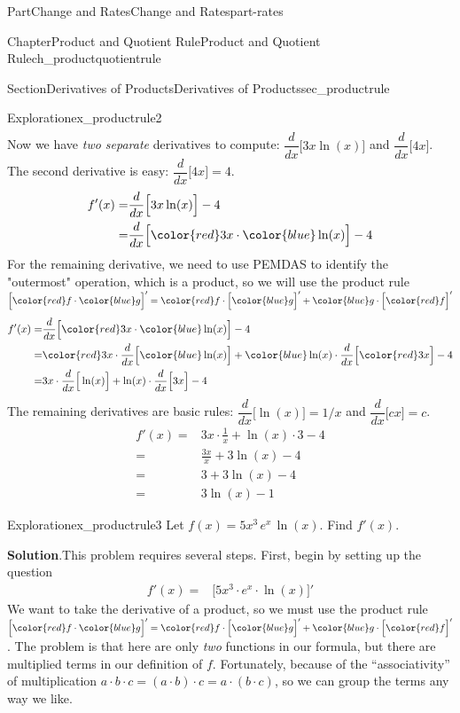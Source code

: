 \documentclass[oneside,10pt,]{tufte-book}
\newcommand{\blocktitlefont}{\relax}
\numberwithin{equation}{chapter}
\newcommand{\red}[1]{   {\color{red}   #1}   }
\newcommand{\blue}[1]{  {\color{blue}  #1}  }
\newcommand{\ddx}[1]{ \dfrac{d}{dx} \Big[ #1 \Big]  }
\newcommand{\D}[1]{ \Big[ #1 \Big]'  }
\newcommand{\amp}{&}
\begin{document}
\begin{partptx}{Part}{Change and Rates}{}{Change and Rates}{}{}{part-rates}
\begin{chapterptx}{Chapter}{Product and Quotient Rule}{}{Product and Quotient Rule}{}{}{ch_productquotientrule}
\begin{sectionptx}{Section}{Derivatives of Products}{}{Derivatives of Products}{}{}{sec_productrule}
\begin{exploration}{Exploration}{}{ex_productrule2}
\begin{align*}
\end{align*}
Now we have \emph{two separate} derivatives to compute: \(\ddx{ 3x\ln(x) } \) and \(\ddx{4x}\). The second derivative is easy: \(\ddx{4x}=4\).%
\begin{align*}
f'(x) = \amp \ddx{ 3x\ln(x) } - 4 \\
= \amp \ddx{ \red{3x}\cdot \blue{\ln(x)} } - 4 
\end{align*}
For the remaining derivative, we need to use PEMDAS to identify the "outermost" operation, which is a product, so we will use the product rule \(\D{\red{f}\cdot \blue{g}} = \red{f}\cdot \D{\blue{g}} + \blue{g}\cdot \D{\red{f}}\)%
\begin{align*}
f'(x) = \amp \ddx{ \red{3x}\cdot \blue{\ln(x)} } - 4 \\
= \amp \red{3x}\cdot \ddx{\blue{\ln(x)} } + \blue{\ln(x)}\cdot \ddx{\red{3x}} - 4 \\
= \amp 3x\cdot \ddx{ \ln(x) } + \ln(x) \cdot \ddx{ 3x } - 4 
\end{align*}
The remaining derivatives are basic rules: \(\ddx{\ln(x)} = 1/x\) and \(\ddx{cx} = c\).%
\begin{align*}
f'(x) = \amp 3x\cdot \frac{1}{x} + \ln(x) \cdot 3 - 4 \\
= \amp \frac{3x}{x} + 3\ln(x) - 4 \\
= \amp 3 + 3\ln(x) - 4 \\
= \amp 3\ln(x) - 1 
\end{align*}
%
\end{exploration}%
\begin{exploration}{Exploration}{}{ex_productrule3}%
Let \(f(x) = 5x^3\, e^x\,\ln(x)\).  Find \(f'(x)\).%
\par\smallskip%
\noindent\textbf{\blocktitlefont Solution}.\hypertarget{ex_productrule3-2}{}\quad{}This problem requires several steps.  First, begin by setting up the question%
\begin{align*}
f'(x) = \amp \D{5x^3\cdot e^x\cdot\ln(x)}  
\end{align*}
We want to take the derivative of a product, so we must use the product rule \(\D{\red{f}\cdot\blue{g}} = \red{f}\cdot\D{\blue{g}} + \blue{g}\cdot\D{\red{f}}\).  The problem is that  here are only \emph{two} functions in our formula, but there are multiplied terms in our definition of \(f\).  Fortunately, because of the ``associativity'' of multiplication \(a\cdot b\cdot c = (a\cdot b)\cdot c = a\cdot (b\cdot c)\), so we can group the terms any way we like.%
\begin{align*}

\end{align*}
\end{exploration}
\end{sectionptx}
\end{chapterptx}
\end{partptx}
\end{document}
